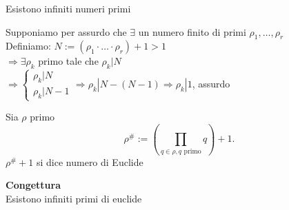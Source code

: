 \documentclass[12px]{article}
\begin{document}
{\begin{dimo}
	\end{dimo}
	\begin{teo}[Euclide]
		Esistono infiniti numeri primi
	\end{teo}
	\begin{dimo}
		Supponiamo per assurdo che $\exists$ un numero finito di primi $\rho_1,\ldots, \rho_r$\\
		Definiamo:
		$N:= (\rho_1 \cdot\ldots\cdot\rho_r) + 1 > 1$\\
		$ \Rightarrow\exists \rho_k$ primo tale che $\rho_k | N$\\
		 $ \Rightarrow \begin{cases}
		 	\rho_k|N\\
			\rho_k|N-1
		 \end{cases} \Rightarrow \rho_k|N-(N-1) \Rightarrow \rho_k | 1$, assurdo
	\end{dimo}
	\begin{defi}
		Sia $\rho$ primo
		\[
			\rho^\# := \left(\prod_{q\in\rho, q \text{ primo}} q \right) + 1
		.\] 
		$\rho^\#+1$ si dice numero di Euclide
	\end{defi}
	\textbf{Congettura}\\
	Esistono infiniti primi di euclide

}
\end{document}
